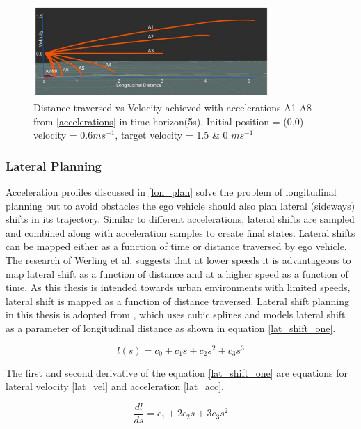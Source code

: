  \begin{figure}
	\centering
	\includegraphics[width=0.8\textwidth]{Images/concept/distvsvel2.jpg}
	\caption{Distance traversed vs Velocity achieved with accelerations A1-A8 from \ref{accelerations} in time horizon(5s), Initial position = (0,0) velocity = 0.6$ms^{-1}$, target velocity = 1.5 \& 0 $ms^{-1}$}
	\label{velocities}
\end{figure}


\subsubsection{Lateral Planning}

Acceleration profiles discussed in \ref{lon_plan} solve the problem of longitudinal planning but to avoid obstacles the ego vehicle should also plan lateral (sideways) shifts in its trajectory. Similar to different accelerations, lateral shifts are sampled and combined along with acceleration samples to create final states. Lateral shifts can be mapped either as a function of time or distance traversed by ego vehicle. The research of Werling et al. \cite{werling_frenet} suggests that at lower speeds it is advantageous to map lateral shift as a function of distance and at a higher speed as a function of time. As this thesis is intended towards urban environments with limited speeds, lateral shift is mapped as a function of distance traversed. Lateral shift planning in this thesis is adopted from \cite{real_time_traj_plan_article}, which uses cubic splines and models lateral shift as a parameter of longitudinal distance as shown in equation \ref{lat_shift_one}. 

\begin{equation}
l(s) = c_0 + c_1s + c_2s^2 + c_3s^3
\label{lat_shift_one}
\end{equation}

The first and second derivative of the equation \ref{lat_shift_one} are equations for lateral velocity \ref{lat_vel} and acceleration \ref{lat_acc}.

\begin{equation}
    \frac{dl}{ds} = c_1 + 2c_2s + 3c_3s^2
\label{lat_vel}
\end{equation}


